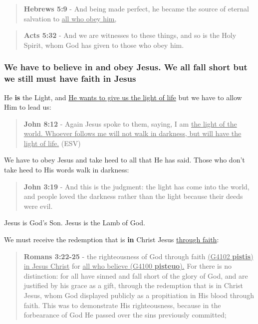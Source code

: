 \documentclass[11pt]{article}
\begin{document}
\begin{quote}
\textbf{Hebrews 5:9} - And being made perfect, he became the source of eternal salvation to \uline{all who obey him,}
\end{quote}

\begin{quote}
\textbf{Acts 5:32} - And we are witnesses to these things, and so is the Holy Spirit, whom God has given to those who obey him.
\end{quote}

\subsubsection{We have to believe in and obey Jesus. We all fall short but we still must have faith in Jesus}
\label{sec:org0a31a4d}
He \textbf{is} the Light, and \uline{He wants to give us the light of life} but we have to allow Him to lead us:

\begin{quote}
\textbf{John 8:12} - Again Jesus spoke to them, saying, I am \uline{the light of the world. Whoever follows me will not walk in darkness, but will have the light of life.} (ESV)
\end{quote}

We have to obey Jesus and take heed to all that He has said. Those who don't take heed to His words walk in darkness:

\begin{quote}
\textbf{John 3:19} - And this is the judgment: the light has come into the world, and people loved the darkness rather than the light because their deeds were evil.
\end{quote}

Jesus is God's Son.
Jesus is the Lamb of God.

We must receive the redemption that is \textbf{in} Christ Jesus \uline{through faith}:

\begin{quote}
\textbf{Romans 3:22-25} - the righteousness of God through faith \uline{(G4102 \textbf{pistis}) in Jesus Christ} for \uline{all who believe (G4100 \textbf{pisteuo}).} For there is no distinction: for all have sinned and fall short of the glory of God, and are justified by his grace as a gift, through the redemption that is in Christ Jesus, whom God displayed publicly as a propitiation in His blood through faith. This was to demonstrate His righteousness, because in the forbearance of God He passed over the sins previously committed;
\end{quote}
\end{document}
